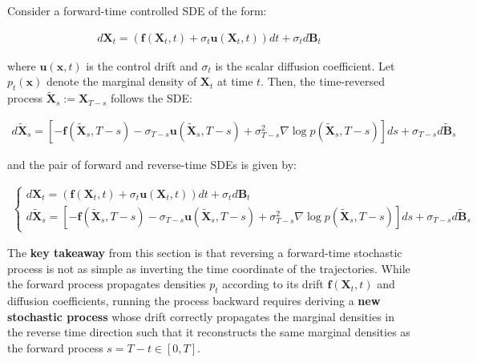 \documentclass{article}
\begin{document}
\begin{corollary}\label{corollary:time-reversal-control}
    Consider a forward-time controlled SDE of the form:
    \begin{small}
    \begin{align}
        d\boldsymbol{X}_t=(\boldsymbol{f}(\boldsymbol{X}_t,t)+\sigma_t\boldsymbol{u}(\boldsymbol{X}_t,t)) dt+ \sigma_td\boldsymbol{B}_t
    \end{align}
    \end{small}
    where $\boldsymbol{u}(\boldsymbol{x},t)$ is the control drift and $\sigma_t$ is the scalar diffusion coefficient. Let $p_t(\boldsymbol{x})$ denote the marginal density of $\boldsymbol{X}_t$ at time $t$. Then, the time-reversed process $\tilde{\boldsymbol{X}}_s:=\boldsymbol{X}_{T-s}$ follows the SDE:
    \begin{small}
    \begin{align}
        d\tilde{\boldsymbol{X}}_s=\left[-\boldsymbol{f}(\tilde{\boldsymbol{X}}_s,T-s)-\sigma_{T-s}\boldsymbol{u}(\tilde{\boldsymbol{X}}_s,T-s)+\sigma_{T-s}^2\nabla\log p(\tilde{\boldsymbol{X}}_s,T-s)\right]ds+\sigma_{T-s}d\widetilde{\boldsymbol{B}}_s
    \end{align}
    \end{small}
    and the pair of forward and reverse-time SDEs is given by:  
    \begin{small}
    \begin{align}
        \begin{cases}
            d\boldsymbol{X}_t=(\boldsymbol{f}(\boldsymbol{X}_t,t)+\sigma_t\boldsymbol{u}(\boldsymbol{X}_t,t)) dt+ \sigma_td\boldsymbol{B}_t\\
            d\tilde{\boldsymbol{X}}_s=\left[-\boldsymbol{f}(\tilde{\boldsymbol{X}}_s,T-s)-\sigma_{T-s}\boldsymbol{u}(\tilde{\boldsymbol{X}}_s,T-s)+\sigma_{T-s}^2\nabla\log p(\tilde{\boldsymbol{X}}_s,T-s)\right]ds+\sigma_{T-s}d\widetilde{\boldsymbol{B}}_s
        \end{cases}\label{eq:controlled-time-reversal-formula}
    \end{align}
    \end{small}
\end{corollary}

The \textbf{key takeaway} from this section is that reversing a forward-time stochastic process is not as simple as inverting the time coordinate of the trajectories. While the forward process propagates densities $p_t$ according to its drift $\boldsymbol{f}(\boldsymbol{X}_t,t)$ and diffusion coefficients, running the process backward requires deriving a \textbf{new stochastic process} whose drift correctly propagates the marginal densities in the reverse time direction such that it reconstructs the same marginal densities as the forward process $s=T-t\in [0,T]$. 
\end{document}
